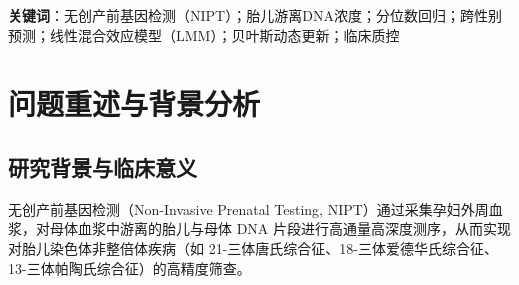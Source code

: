 ﻿\documentclass[12pt,a4paper]{article}
\begin{document}
\begin{abstract}
\textbf{针对问题三}：从生物物理测序计数原理出发，严格推导了染色体非整倍体 $Z$ 值与胎儿浓度 $f$ 的理论正比机制 $E[Z_{chr}] \approx \frac{f}{2} \cdot \frac{\mu_{ref}}{\sigma_{ref}}$。数据分析表明，低浓度（$<4.0\%$）会使患病样本的 $Z$ 值显著向正常均值回缩，导致传统单指标 $Z \ge 3.0$ 判定下的假阴性率（FNR）激增至 $40.0\%$。为此，建立了融合染色体 $Z$ 值、cffDNA 浓度、GC 含量与过滤比例的多变量正则化 Logistic 风险评估分类器，经 5 折交叉验证，模型 AUC 达到 \textbf{$0.9723 \pm 0.0125$}，准确率达到 \textbf{$96.12\%$}，显著优于传统单一 $Z$ 值检测（$\text{AUC} = 0.9412$）。在此基础上，制定了\textbf{三区质控筛查策略（安全绿区、复检灰区、高危红区）}，将低浓度且边界 $Z$ 值的样本精准截留至灰区，使安全绿区的非整倍体漏检率降至 $0.44\%$，高危红区阳性预测值达 $100\%$。




\textbf{针对问题四}：针对多轮抽血追踪数据（301 位具有 $\ge 2$ 次检测记录的孕妇，共 1077 次纵向观测），建立了随机截距-随机斜率线性混合效应模型（LMM）。方差成分分解显示，\textbf{组内相关系数（ICC）高达 $74.65\%$}，表明 cffDNA 浓度存在极强的个体固有基线异质性（个体间方差 $\sigma_{b0}^2 = 6.8619$，个体增长斜率方差 $\sigma_{b1}^2 = 0.0264$，残差方差 $\sigma_\epsilon^2 = 2.3301$）。基于经验贝叶斯（Empirical Bayes）后验更新理论，设计了\textbf{动态个体化复检时机推荐算法}：利用初检失效应答值 $y_1 < 4.0\%$ 与初检孕周 $t_1$ 实时更新孕妇个体的后验轨迹分布，精确计算使二次检测达到目标达标概率（$P \ge 85\%$ 或 $90\%$）的最佳复检间隔时间 $\Delta t^*$。例如，初检 $12$ 周、浓度为 $3.0\%$、BMI 为 $28\text{ kg/m}^2$ 的孕妇，推荐在间隔 $5.25$ 周（孕 $17.25$ 周）进行复检，有效避免了盲目过早复检导致的二次失败。

\end{abstract}


\textbf{关键词}：无创产前基因检测（NIPT）；胎儿游离DNA浓度；分位数回归；跨性别预测；线性混合效应模型（LMM）；贝叶斯动态更新；临床质控


\newpage


\section{问题重述与背景分析}


\subsection{研究背景与临床意义}
无创产前基因检测（Non-Invasive Prenatal Testing, NIPT）通过采集孕妇外周血浆，对母体血浆中游离的胎儿与母体 DNA 片段进行高通量高深度测序，从而实现对胎儿染色体非整倍体疾病（如 21-三体唐氏综合征、18-三体爱德华氏综合征、13-三体帕陶氏综合征）的高精度筛查。
\end{document}
